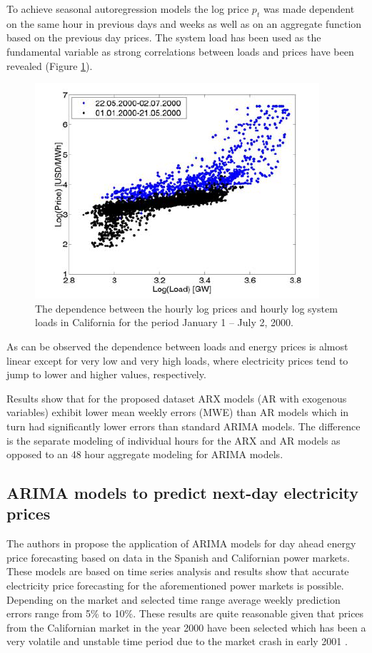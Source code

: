 To achieve seasonal autoregression models the log price $p_t$ was made dependent on the same hour in previous days and weeks as well as on an aggregate function based on the previous day prices. The system load has been used as the fundamental variable as strong correlations between loads and prices have been revealed (Figure \ref{fig:log_loads_vs_log_prices}). 

\begin{figure}[htbp]
	\centering
		\includegraphics{figures/state_of_the_art/log_loads_vs_log_prices.PNG}
	\caption{The dependence between the
hourly log prices and hourly log system
loads in California for the period January 1
– July 2, 2000. \cite{weron2005forecasting}}
	\label{fig:log_loads_vs_log_prices}
\end{figure}

As can be observed the dependence between loads and energy prices is almost linear except for very low and very high loads, where electricity prices tend to jump to lower and higher values, respectively. 

Results show that for the proposed dataset ARX models (AR with exogenous variables) exhibit lower mean weekly errors (MWE) than AR models which in turn had significantly lower errors than standard ARIMA models. The difference is the separate modeling of individual hours for the ARX and AR models as opposed to an 48 hour aggregate modeling for ARIMA models. 

\subsection{ARIMA models to predict next-day electricity prices}

The authors in \cite{contreras2003arima} propose the application of ARIMA models for day ahead energy price forecasting based on data in the Spanish and Californian power markets. These models are based on time series analysis and results show that accurate electricity price forecasting for the aforementioned power markets is possible. Depending on the market and selected time range average weekly prediction errors 
range from 5\% to 10\%. These results are quite reasonable given that prices from the Californian market in the year 2000 have been selected which has been a very volatile and unstable time period due to the market crash in early 2001 \cite{weron2007modeling}. 

